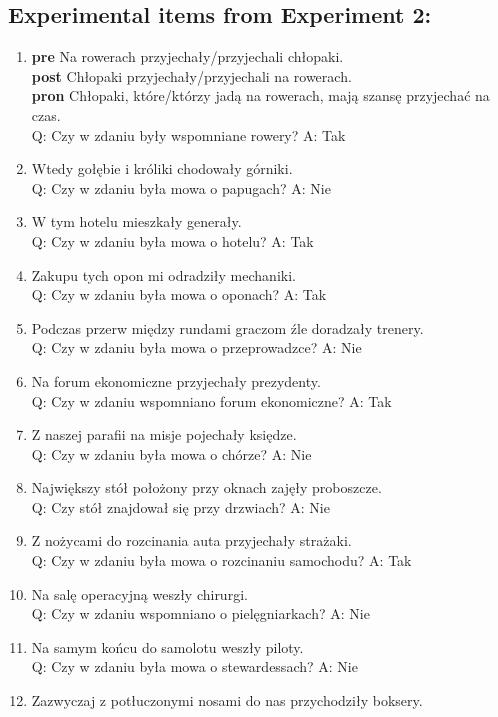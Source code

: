 \subsection*{Experimental items from Experiment 2:}
\begin{enumerate}
\item \textbf{pre} Na rowerach przyjechały/przyjechali chłopaki.\\
  \textbf{post} Chłopaki przyjechały/przyjechali na rowerach.\\
  \textbf{pron} Chłopaki, które/którzy jadą na rowerach, mają szansę przyjechać na czas.\\
	Q: Czy w zdaniu były wspomniane rowery? A: Tak
\item Wtedy gołębie i króliki chodowały górniki.\\
	Q: Czy w zdaniu była mowa o papugach? A: Nie
\item W tym hotelu mieszkały generały.\\
	Q: Czy w zdaniu była mowa o hotelu? A: Tak
\item Zakupu tych opon mi odradziły mechaniki.\\
	Q: Czy w zdaniu była mowa o oponach? A: Tak
\item Podczas przerw między rundami graczom źle doradzały trenery.\\
	Q: Czy w zdaniu była mowa o przeprowadzce? A: Nie
\item Na forum ekonomiczne przyjechały prezydenty.\\
	Q: Czy w zdaniu wspomniano forum ekonomiczne? A: Tak
\item Z naszej parafii na misje pojechały księdze.\\
	Q: Czy w zdaniu była mowa o chórze? A: Nie
\item Największy stół położony przy oknach zajęły proboszcze.\\
	Q: Czy stół znajdował się przy drzwiach? A: Nie
\item Z nożycami do rozcinania auta przyjechały strażaki.\\
	Q: Czy w zdaniu była mowa o rozcinaniu samochodu? A: Tak
\item Na salę operacyjną weszły chirurgi.\\
	Q: Czy w zdaniu wspomniano o pielęgniarkach? A: Nie
\item Na samym końcu do samolotu weszły piloty.\\
	Q: Czy w zdaniu była mowa o stewardessach? A: Nie
\item Zazwyczaj z potłuczonymi nosami do nas przychodziły boksery.\\

\end{enumerate}

